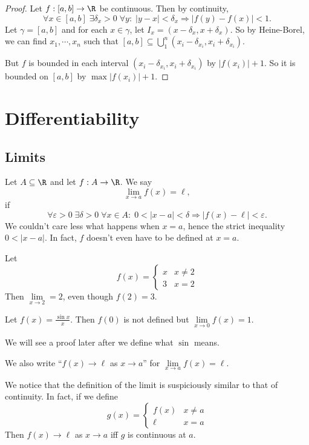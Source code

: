 \documentclass[a4paper]{article}
\begin{document}
\begin{proof}
  Let $f: [a, b]\to \R$ be continuous. Then by continuity,
  \[
    \forall x\in [a, b] \;\exists \delta_x > 0\; \forall y:\;|y - x| < \delta_x\Rightarrow |f(y) - f(x)| < 1.
  \]
  Let $\gamma = [a, b]$ and for each $x\in \gamma$, let $I_x = (x - \delta_x, x + \delta_x)$. So by Heine-Borel, we can find $x_1, \cdots, x_n$ such that $[a, b]\subseteq \bigcup_1^n (x_i - \delta_{x_i}, x_i + \delta_{x_i})$.

  But $f$ is bounded in each interval $(x_i - \delta_{x_i}, x_i + \delta_{x_i})$ by $|f(x_i)| + 1$. So it is bounded on $[a, b]$ by $\max|f(x_i)| + 1$.
\end{proof}

\section{Differentiability}
\subsection{Limits}
\begin{defi}
  Let $A\subseteq \R$ and let $f: A\to \R$. We say
  \[
    \lim_{x\to a}f(x) = \ell,
  \]
  if
  \[
    \forall \varepsilon > 0\;\exists \delta > 0\;\forall x\in A:\; 0 < |x - a| < \delta \Rightarrow  |f(x) - \ell| < \varepsilon.
  \]
  We couldn't care less what happens when $x = a$, hence the strict inequality $0 < |x - a|$. In fact, $f$ doesn't even have to be defined at $x = a$.
\end{defi}

\begin{eg}
  Let
  \[
    f(x) =
    \begin{cases}
      x & x \not = 2\\
      3 & x = 2
    \end{cases}
  \]
  Then $\lim\limits_{x\to 2} = 2$, even though $f(2) = 3$.
\end{eg}

\begin{eg}
  Let $f(x) = \frac{\sin x}{x}$. Then $f(0)$ is not defined but $\lim\limits_{x\to 0}f(x) = 1$.

  We will see a proof later after we define what $\sin$ means.
\end{eg}

\begin{notation}
  We also write ``$f(x)\to \ell$ as $x\to a$'' for $\lim\limits_{x\to a}f(x) = \ell$.
\end{notation}
We notice that the definition of the limit is suspiciously similar to that of continuity. In fact, if we define
\[
  g(x) =
  \begin{cases}
    f(x) & x \not =a\\
    \ell & x = a
  \end{cases}
\]
Then $f(x) \to \ell$ as $x \to a$ iff $g$ is continuous at $a$.
\end{document}
